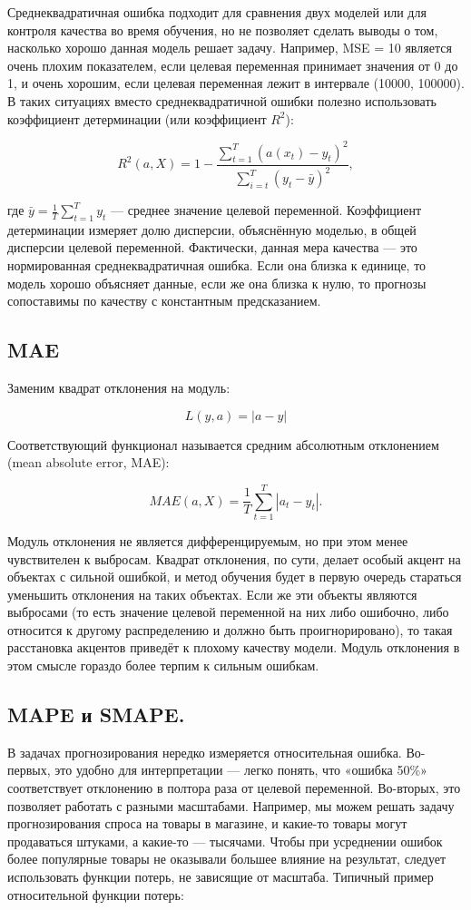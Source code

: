 Среднеквадратичная ошибка подходит для сравнения двух моделей или для
контроля качества во время обучения, но не позволяет сделать выводы о
том, насколько хорошо данная модель решает задачу. Например, MSE = 10
является очень плохим показателем, если целевая переменная принимает
значения от 0 до 1, и очень хорошим, если целевая переменная лежит в
интервале (10000, 100000). В таких ситуациях вместо
среднеквадратичной ошибки полезно использовать коэффициент
детерминации (или коэффициент $R^2$):

\[
  R^2(a, X) = 1 - \frac{\sum_{t=1}^{T} (a(x_t) -
  y_t)^2}{\sum_{i=t}^{T} (y_t - \bar{y})^2},
\]

где $\bar{y} = \frac{1}{T} \sum_{t=1}^{T} y_t$ — среднее значение
целевой переменной. Коэффициент детерминации измеряет долю дисперсии,
объяснённую моделью, в общей дисперсии целевой переменной.
Фактически, данная мера качества — это нормированная
среднеквадратичная ошибка. Если она близка к единице, то модель
хорошо объясняет данные, если же она близка к нулю, то прогнозы
сопоставимы по качеству с константным предсказанием.

\subsection*{MAE}
Заменим квадрат отклонения на модуль:

\[
  L(y, a) = |a - y|
\]

Соответствующий функционал называется средним абсолютным отклонением
(mean absolute error, MAE):

\[
  MAE(a, X) = \frac{1}{T} \sum_{t=1}^{T} |a_t - y_t|.
\]

Модуль отклонения не является дифференцируемым, но при этом менее
чувствителен к выбросам. Квадрат отклонения, по сути, делает особый
акцент на объектах с сильной ошибкой, и метод обучения будет в первую
очередь стараться уменьшить отклонения на таких объектах. Если же эти
объекты являются выбросами (то есть значение целевой переменной на
  них либо ошибочно, либо относится к другому распределению и должно
быть проигнорировано), то такая расстановка акцентов приведёт к
плохому качеству модели. Модуль отклонения в этом смысле гораздо
более терпим к сильным ошибкам.

\subsection*{MAPE и SMAPE.}
В задачах прогнозирования нередко измеряется
относительная ошибка. Во-первых, это удобно для интерпретации — легко
понять, что «ошибка 50\%» соответствует отклонению в полтора раза от
целевой переменной. Во-вторых, это позволяет работать с разными
масштабами. Например, мы можем решать задачу прогнозирования спроса
на товары в магазине, и какие-то товары могут продаваться штуками, а
какие-то — тысячами. Чтобы при усреднении ошибок более популярные
товары не оказывали большее влияние на результат, следует
использовать функции потерь, не зависящие от масштаба. Типичный
пример относительной функции потерь:

